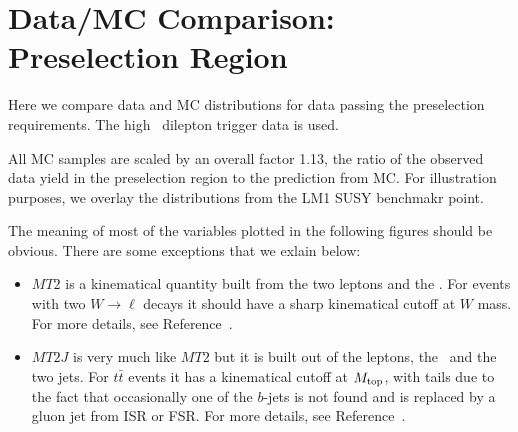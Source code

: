 \clearpage

\section{Data/MC Comparison: Preselection Region}
\label{sec:appendix_datamc}
Here we compare data and MC distributions for data passing the 
preselection requirements. The high \pt\ dilepton trigger
data is used.

All MC samples are scaled by an overall factor 1.13,
the ratio of the observed data yield in the preselection region to the
prediction from MC.
For illustration purposes, we overlay the distributions from the LM1
SUSY benchmakr point.

The meaning of most of the variables plotted in 
the following figures should be obvious.  There
are some exceptions that we exlain below:

\begin{itemize}

\item $MT2$ is a kinematical quantity 
built from the two leptons and the \met.  For events with
two $W \to \ell$ decays it should have a sharp kinematical cutoff
at $W$ mass.  For more details, see Reference~\cite{ref:MT2}.

\item $MT2J$ is very much like $MT2$ but it is built 
out of the leptons, the \met\ and the two jets.  For $t\bar{t}$
events it has a kinematical cutoff at $M_{\rm top}$, with tails
due to the fact that occasionally one of the $b$-jets is not
found and is replaced by a gluon jet from ISR or FSR.
For more details, see Reference~\cite{ref:MT2J}.


\end{itemize}


\clearpage

%
%

%

